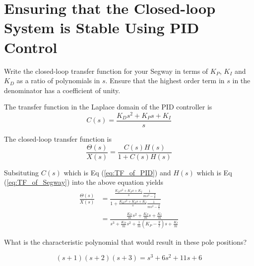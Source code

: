 \newpage
\section{Ensuring that the Closed-loop System is Stable Using PID Control}

\begin{questions}
\setcounter{question}{\value{lastquestioncounter}}

\question[3M]
Write the closed-loop transfer function for your Segway in terms of $K_P$, $K_I$ and $K_D$ as a ratio of polynomials in $s$. Ensure that the highest order term in $s$ in the denominator has a coefficient of unity.

\begin{solution}
   The transfer function in the Laplace domain of the PID controller is
   \begin{equation}\label{eq:TF_of_PID}
   C(s) = \frac{K_D s^2 + K_P s + K_I}{s}
   \end{equation}

   The closed-loop transfer function is
   \begin{equation*}
   \frac{\Theta(s)}{X(s)} = \frac{C(s)H(s)}{1 + C(s)H(s)}
   \end{equation*}

   Subsituting $C(s)$ which is Eq (\ref{eq:TF_of_PID}) and $H(s)$ which is Eq (\ref{eq:TF_of_Segway}) into the above equation yields
   \begin{equation}\label{eq:CLTF}
   \begin{split}
   \frac{\Theta(s)}{X(s)} &= \frac{\frac{K_D s^2 + K_P s + K_I}{s}\frac{1}{m s^2-\frac{g}{l}}}{1 + \frac{K_D s^2 + K_P s + K_I}{s}\frac{1}{m s^2 - \frac{g}{l}}} \\
   &= \frac{\frac{K_D}{m} s^2 + \frac{K_P}{m} s + \frac{K_I}{m}}{s^3 + \frac{K_D}{m} s^2 + \frac{1}{m} (K_P-\frac{g}{l}) s + \frac{K_I}{m}}
   \end{split}
   \end{equation}
\end{solution}

\question[1M]
What is the characteristic polynomial that would result in these pole positions?

\begin{solution}
   \begin{equation}\label{characteristic_polynominal}
   (s+1)(s+2)(s+3) = s^3 + 6s^2 + 11s +6
   \end{equation}
\end{solution}


\end{questions}
